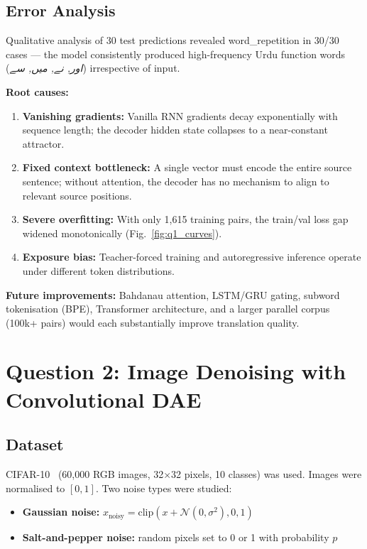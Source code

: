 \documentclass[runningheads]{llncs}
\begin{document}
\subsection{Error Analysis}

Qualitative analysis of 30 test predictions revealed word\_repetition
in 30/30 cases — the model consistently produced high-frequency Urdu
function words (\textit{اور, نے, میں, سے}) irrespective of input.

\textbf{Root causes:}
\begin{enumerate}
    \item \textbf{Vanishing gradients:} Vanilla RNN gradients decay
    exponentially with sequence length; the decoder hidden state
    collapses to a near-constant attractor.
    \item \textbf{Fixed context bottleneck:} A single vector must
    encode the entire source sentence; without attention, the decoder
    has no mechanism to align to relevant source positions.
    \item \textbf{Severe overfitting:} With only 1,615 training pairs,
    the train/val loss gap widened monotonically (Fig.~\ref{fig:q1_curves}).
    \item \textbf{Exposure bias:} Teacher-forced training and
    autoregressive inference operate under different token distributions.
\end{enumerate}

\textbf{Future improvements:} Bahdanau attention, LSTM/GRU gating,
subword tokenisation (BPE), Transformer architecture, and a larger
parallel corpus (100k+ pairs) would each substantially improve
translation quality.

\section{Question 2: Image Denoising with Convolutional DAE}

\subsection{Dataset}

CIFAR-10~\cite{cifar10} (60,000 RGB images, 32$\times$32 pixels,
10 classes) was used. Images were normalised to $[0,1]$. Two noise
types were studied:
\begin{itemize}
    \item \textbf{Gaussian noise:} $x_{\text{noisy}} = \text{clip}(x + \mathcal{N}(0, \sigma^2), 0, 1)$
    \item \textbf{Salt-and-pepper noise:} random pixels set to 0 or 1 with probability $p$
\end{itemize}
\end{document}

